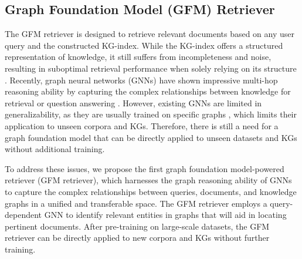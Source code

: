 \subsection{Graph Foundation Model (GFM) Retriever}\label{sec:gfm-retriever}
The GFM retriever is designed to retrieve relevant documents based on any user query and the constructed KG-index. While the KG-index offers a structured representation of knowledge, it still suffers from incompleteness and noise, resulting in suboptimal retrieval performance when solely relying on its structure \citep{gutiérrez2024hipporag}. Recently, graph neural networks (GNNs) \citep{wu2020comprehensive} have shown impressive multi-hop reasoning ability by capturing the complex relationships between knowledge for retrieval or question answering \citep{mavromatis2024gnn,he2024g}. However, existing GNNs are limited in generalizability, as they are usually trained on specific graphs \citep{maoposition,liu2025graph}, which limits their application to unseen corpora and KGs. Therefore, there is still a need for a graph foundation model that can be directly applied to unseen datasets and KGs without additional training.

To address these issues, we propose the first graph foundation model-powered retriever (GFM retriever), which harnesses the graph reasoning ability of GNNs to capture the complex relationships between queries, documents, and knowledge graphs in a unified and transferable space. The GFM retriever employs a query-dependent GNN to identify relevant entities in graphs that will aid in locating pertinent documents. After pre-training on large-scale datasets, the GFM retriever can be directly applied to new corpora and KGs without further training.

